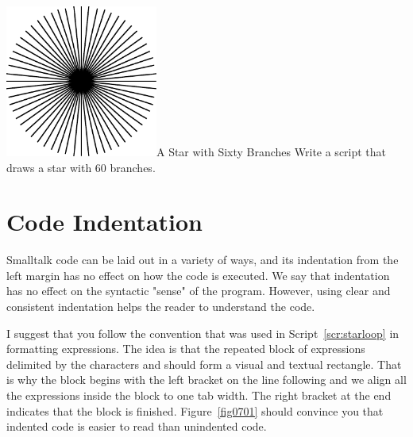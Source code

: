 \documentclass[a4paper,10pt,twoside]{book}
\begin{document}
 


\begin{scriptfigwithsize}[0.4]{\includegraphics[width=5cm]{loopStar60}}{A Star with Sixty Branches}\label{scr:spyglass}
Write a script that draws a star with 60 branches.
\end{scriptfigwithsize}



\section{Code Indentation}

Smalltalk code can be laid out in a variety of ways, and its indentation from the left margin has no effect on how the code is executed. We say that indentation has no effect on the syntactic "sense" of the program. However, using clear and consistent indentation helps the reader to understand the code. 

I suggest that you follow the convention that was used in Script~\ref{scr:starloop}  in formatting  expressions. The idea is that the repeated block of expressions delimited by the characters \ct{[} and \ct{]} should form a visual and textual rectangle. That is why the block begins with the left bracket on the line following  and we align all the expressions inside the block to one tab width. The right bracket at the end indicates that the block is finished. Figure~\ref{fig0701} should convince you that indented code is easier to read than unindented code. 
\end{document}
